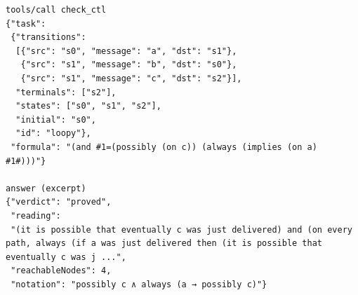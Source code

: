 \begin{lstlisting}[language={},basicstyle=\ttfamily\footnotesize,breaklines=true]
tools/call check_ctl
{"task":
 {"transitions":
  [{"src": "s0", "message": "a", "dst": "s1"},
   {"src": "s1", "message": "b", "dst": "s0"},
   {"src": "s1", "message": "c", "dst": "s2"}],
  "terminals": ["s2"],
  "states": ["s0", "s1", "s2"],
  "initial": "s0",
  "id": "loopy"},
 "formula": "(and #1=(possibly (on c)) (always (implies (on a) #1#)))"}

answer (excerpt)
{"verdict": "proved",
 "reading":
 "(it is possible that eventually c was just delivered) and (on every path, always (if a was just delivered then (it is possible that eventually c was j ...",
 "reachableNodes": 4,
 "notation": "possibly c ∧ always (a → possibly c)"}
\end{lstlisting}
